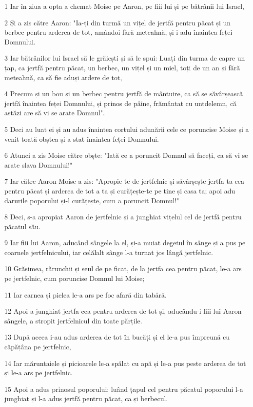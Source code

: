 \par 1 Iar în ziua a opta a chemat Moise pe Aaron, pe fiii lui și pe bătrânii lui Israel,
\par 2 Și a zis către Aaron: "Ia-ți din turmă un vițel de jertfă pentru păcat și un berbec pentru arderea de tot, amândoi fără meteahnă, și-i adu înaintea feței Domnului.
\par 3 Iar bătrânilor lui Israel să le grăiești și să le spui: Luați din turma de capre un țap, ca jertfă pentru păcat, un berbec, un vițel și un miel, toți de un an și fără meteahnă, ca să fie aduși ardere de tot,
\par 4 Precum și un bou și un berbec pentru jertfă de mântuire, ca să se săvârșească jertfă înaintea feței Domnului, și prinos de pâine, frământat cu untdelemn, că astăzi are să vi se arate Domnul".
\par 5 Deci au luat ei și au adus înaintea cortului adunării cele ce poruncise Moise și a venit toată obștea și a stat înaintea feței Domnului.
\par 6 Atunci a zis Moise către obște: "Iată ce a poruncit Domnul să faceți, ca să vi se arate slava Domnului!"
\par 7 Iar către Aaron Moise a zis: "Apropie-te de jertfelnic și săvârșește jertfa ta cea pentru păcat și arderea de tot a ta și curățește-te pe tine și casa ta; apoi adu darurile poporului și-l curățește, cum a poruncit Domnul!"
\par 8 Deci, s-a apropiat Aaron de jertfelnic și a junghiat vițelul cel de jertfă pentru păcatul său.
\par 9 Iar fiii lui Aaron, aducând sângele la el, și-a muiat degetul în sânge și a pus pe coarnele jertfelnicului, iar celălalt sânge l-a turnat jos lângă jertfelnic.
\par 10 Grăsimea, rărunchii și seul de pe ficat, de la jertfa cea pentru păcat, le-a ars pe jertfelnic, cum poruncise Domnul lui Moise;
\par 11 Iar carnea și pielea le-a ars pe foc afară din tabără.
\par 12 Apoi a junghiat jertfa cea pentru arderea de tot și, aducându-i fiii lui Aaron sângele, a stropit jertfelnicul din toate părțile.
\par 13 După aceea i-au adus arderea de tot în bucăți și el le-a pus împreună cu căpățâna pe jertfelnic,
\par 14 Iar măruntaiele și picioarele le-a spălat cu apă și le-a pus peste arderea de tot și le-a ars pe jertfelnic.
\par 15 Apoi a adus prinosul poporului: luând țapul cel pentru păcatul poporului l-a junghiat și l-a adus jertfă pentru păcat, ca și berbecul.
